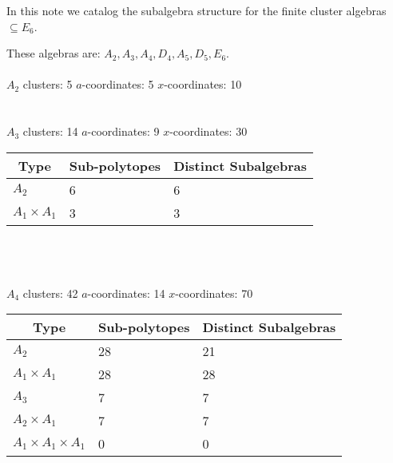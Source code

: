 \documentclass[12pt]{article}
\begin{document}
\thispagestyle{fancyplain}

\fancyhf{}

\cfoot{\fancyplain{}{\thepage}}


In this note we catalog the subalgebra structure for the finite cluster algebras \(\subseteq E_6\).

These algebras are: \(A_2, A_3, A_4, D_4, A_5, D_5, E_6\).\\ \\ 

{\Huge\underline{\(A_2\)}} \quad clusters: 5 \qquad $a$-coordinates: 5 \qquad $x$-coordinates: 10 \\ \\ \\


{\Huge\underline{\(A_3\)}} \quad clusters: 14 \qquad \(a\)-coordinates: 9 \qquad \(x\)-coordinates: 30 \\

\begin{tabular}{ | l | l | l |}
\multicolumn{1}{c}{Type} &  \multicolumn{1}{c}{Sub-polytopes}  &  \multicolumn{1}{c}{Distinct Subalgebras} \\
\hline \(A_2\) & 6 & 6 \\ 
\hline \(A_1 \times A_1\) & 3 & 3 \\ 
\hline
\end{tabular} \\ \\ \\ 


{\Huge \underline{\(A_4\)}} \quad clusters: 42 \qquad \(a\)-coordinates: 14 \qquad \(x\)-coordinates: 70\\ 

\begin{tabular}{ | l | l | l |}
\multicolumn{1}{c}{Type} &  \multicolumn{1}{c}{Sub-polytopes}  &  \multicolumn{1}{c}{Distinct Subalgebras} \\
\hline \(A_2\) & 28 & 21 \\ 
\hline \(A_1 \times A_1\) & 28 & 28 \\ \hline 
\hline \(A_3\) & 7 & 7 \\ 
\hline \(A_2 \times A_1\) & 7 & 7 \\ 
\hline \(A_1 \times A_1 \times A_1\) & 0 & 0 \\ 
\hline
\end{tabular} \\ \\ \\ 
\end{document}
